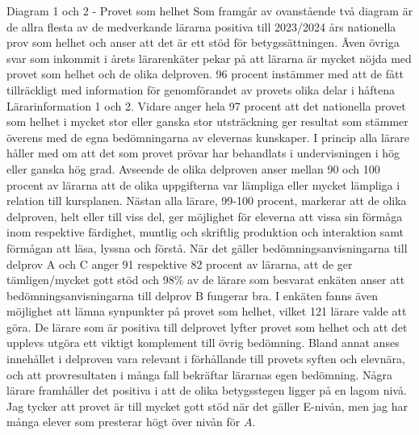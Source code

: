 Diagram 1 och 2 - Provet som helhet
Som framgår av ovanstående två diagram är de allra flesta av de medverkande lärarna positiva till 2023/2024 års nationella prov som helhet och anser att det är ett stöd för betygssättningen.
Även övriga svar som inkommit i årets lärarenkäter pekar på att lärarna är mycket nöjda med provet som helhet och de olika delproven. 96 procent instämmer med att de fått tillräckligt med information för genomförandet av provets olika delar i håftena Lärarinformation 1 och 2. Vidare anger hela 97 procent att det nationella provet som helhet i mycket stor eller ganska stor utsträckning ger resultat som stämmer överens med de egna bedömningarna av elevernas kunskaper. I princip alla lärare håller med om att det som provet prövar har behandlats i undervisningen i hög eller ganska hög grad.
Avseende de olika delproven anser mellan 90 och 100 procent av lärarna att de olika uppgifterna var lämpliga eller mycket lämpliga i relation till kursplanen. Nästan alla lärare, 99-100 procent, markerar att de olika delproven, helt eller till viss del, ger möjlighet för eleverna att vissa sin förmåga inom respektive färdighet, muntlig och skriftlig produktion och interaktion samt förmågan att läsa, lyssna och förstå.
När det gäller bedömningsanvisningarna till delprov A och C anger 91 respektive 82 procent av lärarna, att de ger tämligen/mycket gott stöd och 98\% av de lärare som besvarat enkäten anser att bedömningsanvisningarna till delprov B fungerar bra.
I enkäten fanns även möjlighet att lämna synpunkter på provet som helhet, vilket 121 lärare valde att göra. De lärare som är positiva till delprovet lyfter provet som helhet och att det upplevs utgöra ett viktigt komplement till övrig bedömning. Bland annat anses innehållet i delproven vara relevant i förhållande till provets syften och elevnära, och att provresultaten i många fall bekräftar lärarnas egen bedömning. Några lärare framhåller det positiva i att de olika betygsstegen ligger på en lagom nivå.
Jag tycker att provet är till mycket gott stöd när det gäller E-nivån, men jag har många elever som presterar högt över nivån för \(A\).

